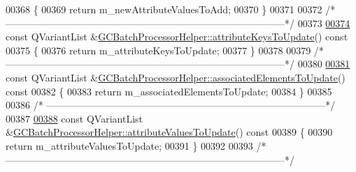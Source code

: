 \begin{DoxyCode}
00368 \textcolor{keyword}{}\{
00369   \textcolor{keywordflow}{return} m\_newAttributeValuesToAdd;
00370 \}
00371 
00372 \textcolor{comment}{/*
      --------------------------------------------------------------------------------------*/}
00373 
\hypertarget{gcbatchprocessorhelper_8cpp_source_l00374}{}\hyperlink{class_g_c_batch_processor_helper_a4cad81bffaa5af1531a72ccaeaedd600}{00374} \textcolor{keyword}{const} QVariantList &\hyperlink{class_g_c_batch_processor_helper_a4cad81bffaa5af1531a72ccaeaedd600}{GCBatchProcessorHelper::attributeKeysToUpdate}()\textcolor{keyword}{ const}
00375 \textcolor{keyword}{}\{
00376   \textcolor{keywordflow}{return} m\_attributeKeysToUpdate;
00377 \}
00378 
00379 \textcolor{comment}{/*
      --------------------------------------------------------------------------------------*/}
00380 
\hypertarget{gcbatchprocessorhelper_8cpp_source_l00381}{}\hyperlink{class_g_c_batch_processor_helper_a22c3d5f21c3dff029e89536c0a08daf4}{00381} \textcolor{keyword}{const} QVariantList &\hyperlink{class_g_c_batch_processor_helper_a22c3d5f21c3dff029e89536c0a08daf4}{GCBatchProcessorHelper::associatedElementsToUpdate}()\textcolor{keyword}{ const}
00382 \textcolor{keyword}{}\{
00383   \textcolor{keywordflow}{return} m\_associatedElementsToUpdate;
00384 \}
00385 
00386 \textcolor{comment}{/*
      --------------------------------------------------------------------------------------*/}
00387 
\hypertarget{gcbatchprocessorhelper_8cpp_source_l00388}{}\hyperlink{class_g_c_batch_processor_helper_a390cab72c76739bea0d98d5ba1ff7e21}{00388} \textcolor{keyword}{const} QVariantList &\hyperlink{class_g_c_batch_processor_helper_a390cab72c76739bea0d98d5ba1ff7e21}{GCBatchProcessorHelper::attributeValuesToUpdate}()\textcolor{keyword}{ const}
00389 \textcolor{keyword}{}\{
00390   \textcolor{keywordflow}{return} m\_attributeValuesToUpdate;
00391 \}
00392 
00393 \textcolor{comment}{/*
      --------------------------------------------------------------------------------------*/}
\end{DoxyCode}
